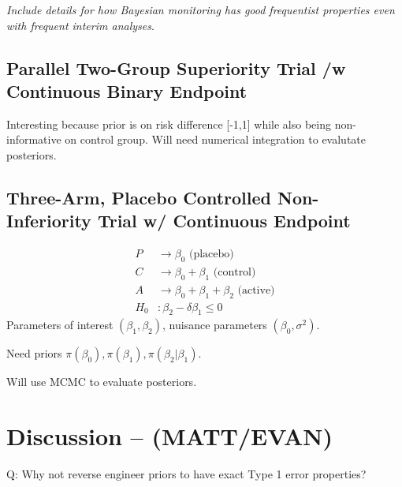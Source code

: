 \documentclass[12pt]{article}
\begin{document}
\textit{Include details for how Bayesian monitoring has good frequentist properties even with frequent interim analyses}.





\subsection{Parallel Two-Group Superiority Trial /w Continuous Binary Endpoint}
Interesting because prior is on risk difference [-1,1] while also being non-informative on control group. Will need numerical integration to evalutate posteriors.
\subsection{Three-Arm, Placebo Controlled Non-Inferiority Trial w/ Continuous Endpoint}
\begin{align*}
P&\rightarrow\beta_0 \text{ (placebo)}\\
C&\rightarrow\beta_0+\beta_1 \text{ (control)}\\
A&\rightarrow\beta_0+\beta_1+\beta_2 \text{ (active)}\\
H_0&:\beta_2-\delta\beta_1\leq 0
\end{align*}
Parameters of interest $(\beta_1,\beta_2)$, nuisance parameters $(\beta_0,\sigma^2)$.

Need priors $\pi(\beta_0), \pi(\beta_1), \pi(\beta_2|\beta_1)$. 

Will use MCMC to evaluate posteriors.
\section{Discussion -- (MATT/EVAN)}
Q: Why not reverse engineer priors to have exact Type 1 error properties?
\end{document}
